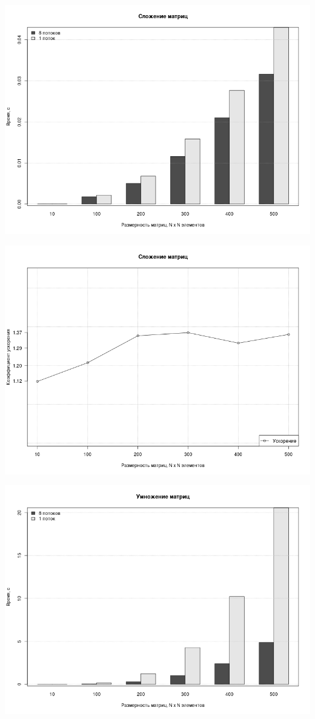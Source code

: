 \begin{frame}[allowframebreaks]

\begin{center}
\includegraphics[scale=0.38]{../Paper/Figures/SummarizingTime}

\includegraphics[scale=0.38]{../Paper/Figures/SummarizingAcceleration}

\includegraphics[scale=0.38]{../Paper/Figures/MultiplicationTime}


\end{center}
\end{frame}
